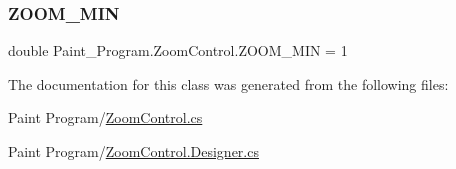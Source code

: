 \mbox{\label{class_paint___program_1_1_zoom_control_a615b9941df411c331af5041d38da6ad2}} 
\subsubsection{\texorpdfstring{Z\+O\+O\+M\+\_\+\+M\+IN}{ZOOM\_MIN}}
{\footnotesize\ttfamily double Paint\+\_\+\+Program.\+Zoom\+Control.\+Z\+O\+O\+M\+\_\+\+M\+IN = 1\hspace{0.3cm}{\ttfamily [private]}}



The documentation for this class was generated from the following files\+:\begin{DoxyCompactItemize}
\item 
Paint Program/\mbox{\hyperlink{_zoom_control_8cs}{Zoom\+Control.\+cs}}\item 
Paint Program/\mbox{\hyperlink{_zoom_control_8_designer_8cs}{Zoom\+Control.\+Designer.\+cs}}\end{DoxyCompactItemize}
